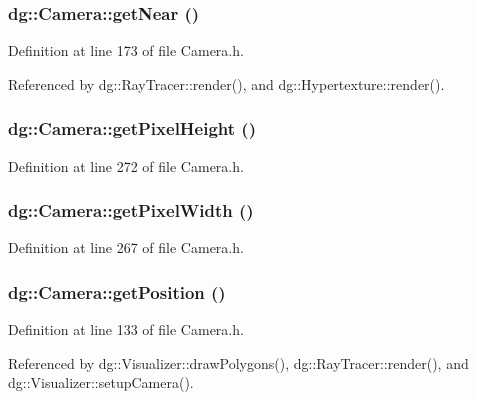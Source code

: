 \subsubsection{ dg::Camera::get\-Near ()\hspace{0.3cm}{\tt  [inline]}}\label{classdg_1_1Camera_a12}




Definition at line 173 of file Camera.h.

Referenced by dg::Ray\-Tracer::render(), and dg::Hypertexture::render().
\subsubsection{ dg::Camera::get\-Pixel\-Height ()\hspace{0.3cm}{\tt  [inline]}}\label{classdg_1_1Camera_a34}




Definition at line 272 of file Camera.h.
\subsubsection{ dg::Camera::get\-Pixel\-Width ()\hspace{0.3cm}{\tt  [inline]}}\label{classdg_1_1Camera_a33}




Definition at line 267 of file Camera.h.
\subsubsection{ dg::Camera::get\-Position ()\hspace{0.3cm}{\tt  [inline]}}\label{classdg_1_1Camera_a3}




Definition at line 133 of file Camera.h.

Referenced by dg::Visualizer::draw\-Polygons(), dg::Ray\-Tracer::render(), and dg::Visualizer::setup\-Camera().
